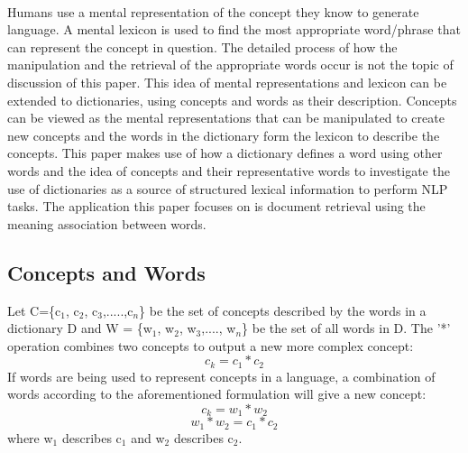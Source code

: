 \documentclass[runningheads]{llncs}
\begin{document}
\paragraph{}
Humans use a mental representation of the concept they know to generate language. A mental lexicon is used to find the most appropriate word/phrase that can represent the concept in question. The detailed process of how the manipulation and the retrieval of the appropriate words occur is not the topic of discussion of this paper. This idea of mental representations and lexicon can be extended to dictionaries, using concepts and words as their description. Concepts can be viewed as the mental representations that can be manipulated to create new concepts and the words in the dictionary form the lexicon to describe the concepts. This paper makes use of how a dictionary defines a word using other words and the idea of concepts and their representative words to investigate the use of dictionaries as a source of structured lexical information to perform NLP tasks. The application this paper focuses on is document retrieval using the meaning association between words.
\subsection{Concepts and Words}
Let C=\{c$_{1}$, c$_{2}$, c$_{3}$,.....,c$_{n}$\} be the set of concepts described by the words in a dictionary D and W = \{w$_{1}$, w$_{2}$, w$_{3}$,...., w$_{n}$\} be the set of all words in D. The '*' operation combines two concepts to output a new more complex concept:
\begin{equation}
     c_{k} = c_{1}*c_{2}
\end{equation}
If words are being used to represent concepts in a language, a combination of words according to the aforementioned formulation will give a new concept:
\begin{equation}
    c_{k} = w_{1}*w_{2} 
\end{equation}
\begin{equation}
    w_{1}*w_{2} = c_{1}*c_{2}
\end{equation}
where w$_{1}$ describes c$_{1}$ and w$_{2}$ describes c$_{2}$.
\end{document}
